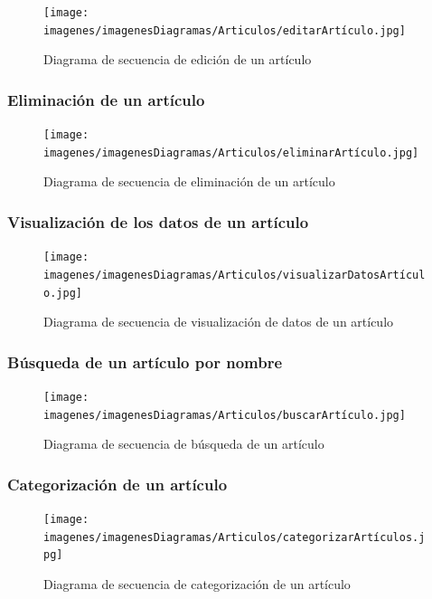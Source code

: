 \begin{figure}[H]
	\centering
	\texttt{[image: imagenes/imagenesDiagramas/Articulos/editarArtículo.jpg]}
	\caption{Diagrama de secuencia de edición de un artículo}
	\label{fig:seqdiag4}
\end{figure}

\subsubsection{Eliminación de un artículo}

\begin{figure}[H]
	\centering
	\texttt{[image: imagenes/imagenesDiagramas/Articulos/eliminarArtículo.jpg]}
	\caption{Diagrama de secuencia de eliminación de un artículo}
	\label{fig:seqdiag5}
\end{figure}

\subsubsection{Visualización de los datos de un artículo}

\begin{figure}[H]
	\centering
	\texttt{[image: imagenes/imagenesDiagramas/Articulos/visualizarDatosArtículo.jpg]}
	\caption{Diagrama de secuencia de visualización de datos de un artículo}
	\label{fig:seqdiag6}
\end{figure}

\subsubsection{Búsqueda de un artículo por nombre}

\begin{figure}[H]
	\centering
	\texttt{[image: imagenes/imagenesDiagramas/Articulos/buscarArtículo.jpg]}
	\caption{Diagrama de secuencia de búsqueda de un artículo}
	\label{fig:seqdiag7}
\end{figure}

\subsubsection{Categorización de un artículo}

\begin{figure}[H]
	\centering
	\texttt{[image: imagenes/imagenesDiagramas/Articulos/categorizarArtículos.jpg]}
	\caption{Diagrama de secuencia de categorización de un artículo}
	\label{fig:seqdiag8}
\end{figure}

